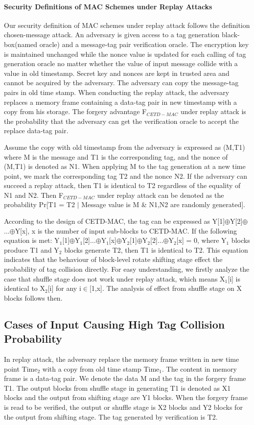 \documentclass{article}
\begin{document}
\paragraph{Security Definitions of MAC Schemes under Replay Attacks}
Our security definition of MAC schemes under replay attack follows the definition chosen-message attack. 
An adversary is given access to a tag generation black-box(named oracle) and a message-tag pair verification oracle. The encryption key is maintained unchanged while the nonce value is updated for each calling of tag generation oracle no matter whether the value of input message collide with a value in old timestamp. Secret key and nonces are kept in trusted area and cannot be acquired by the adversary. The adversary can copy the message-tag pairs in old time stamp. When conducting the replay attack, the adversary replaces a memory frame containing a data-tag pair in new timestamp with a copy from his storage. The forgery advantage F$_{CETD-MAC}$ under replay attack is the probability that the adversary can get the verification oracle to accept the replace data-tag pair.  

Assume the copy with old timestamp from the adversary is expressed as (M,T1) where M is the message and T1 is the corresponding tag, and the nonce of (M,T1) is denoted as N1. When applying M to the tag generation at a new time point, we mark the corresponding tag T2 and the nonce N2. If the adversary can succeed a replay attack, then T1 is identical to T2 regardless of the equality of N1 and N2.
Then F$_{CETD-MAC}$ under replay attack can be denoted as the probability Pr[T1 = T2 $\mid$ Message value is M \& N1,N2 are randomly generated]. 

According to the design of CETD-MAC, the tag can be expressed as Y[1]$\oplus$Y[2]$\oplus$$\ldots$$\oplus$Y[x], x is the number of input sub-blocks to CETD-MAC. If the following equation is met:
Y$_1$[1]$\oplus$Y$_1$[2]$\ldots$$\oplus$Y$_1$[x]$\oplus$Y$_2$[1]$\oplus$Y$_2$[2]$\ldots$$\oplus$Y$_2$[x] = 0, where Y$_1$ blocks produce T1 and Y$_2$ blocks generate T2, then T1 is identical to T2. This equation indicates that the behaviour of block-level rotate shifting stage effect the probability of tag collision directly. For easy understanding, we firstly analyze the case that shuffle stage does not work under replay attack, which means X$_1$[i] is identical to X$_2$[i] for any i$\in$[1,x]. The analysis of effect from shuffle stage on X blocks follows then.

\subsection{Cases of Input Causing High Tag Collision Probability}
In replay attack, the adversary replace the memory frame written in new time point Time$_2$ with a copy from old time stamp Time$_1$. The content in memory frame is a data-tag pair. We denote the data M and the tag in the forgery frame T1. The output blocks from shuffle stage in generating T1 is denoted as X1 blocks and the output from shifting stage are Y1 blocks. When the forgery frame is read to be verified, the output or shuffle stage is X2 blocks and Y2 blocks for the output from shifting stage. The tag generated by verification is T2.  
\end{document}
